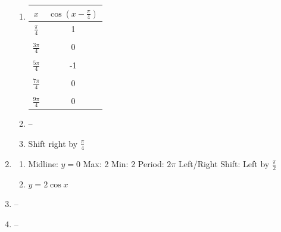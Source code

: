 \documentclass{article}
\begin{document}
\begin{enumerate}
	\begin{enumerate}
	
	\item
	
		\begin{tabular}{ c | c }
		
		$x$ & $\cos{(x - \frac{\pi}{4})}$ \\
		
		\hline
		
		$\frac{\pi}{4}$ & 1 \\

		\\
		
		$\frac{3\pi}{4}$ & 0 \\
		
		\\
		
		$\frac{5\pi}{4}$ & -1 \\
		
		\\
		
		$\frac{7\pi}{4}$ & 0 \\
		
		\\
		
		$\frac{9\pi}{4}$ & 0
		
		\end{tabular}
	
	\item --
	
	\item Shift right by $\frac{\pi}{4}$
	
	\end{enumerate}
	
\item

	\begin{enumerate}
	
	\item Midline: $y = 0$ \newline
		Max: 2 \newline
		Min: 2 \newline
		Period: $2\pi$ \newline
		Left/Right Shift: Left by $\frac{\pi}{2}$
		
	\item $y = 2\cos{x}$
	
	\end{enumerate}
	
\item --

\item --


\end{enumerate}
\end{document}

